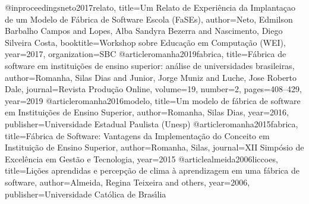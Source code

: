 @inproceedings{neto2017relato,
  title={Um Relato de Experi{\^e}ncia da Implanta{\c{c}}ao de um Modelo de F{\'a}brica de Software Escola (FaSEs)},
  author={Neto, Edmilson Barbalho Campos and Lopes, Alba Sandyra Bezerra and Nascimento, Diego Silveira Costa},
  booktitle={Workshop sobre Educa{\c{c}}{\~a}o em Computa{\c{c}}{\~a}o (WEI)},
  year={2017},
  organization={SBC}
}
@article{romanha2019fabrica,
  title={F{\'a}brica de software em institui{\c{c}}{\~o}es de ensino superior: an{\'a}lise de universidades brasileiras},
  author={Romanha, Silas Dias and Junior, Jorge Muniz and Luche, Jose Roberto Dale},
  journal={Revista Produ{\c{c}}{\~a}o Online},
  volume={19},
  number={2},
  pages={408--429},
  year={2019}
}
@article{romanha2016modelo,
  title={Um modelo de f{\'a}brica de software em Institui{\c{c}}{\~o}es de Ensino Superior},
  author={Romanha, Silas Dias},
  year={2016},
  publisher={Universidade Estadual Paulista (Unesp)}
}
@article{romanha2015fabrica,
  title={F{\'a}brica de Software: Vantagens da Implementa{\c{c}}{\~a}o do Conceito em Institui{\c{c}}{\~a}o de Ensino Superior},
  author={Romanha, Silas},
  journal={XII Simp{\'o}sio de Excel{\^e}ncia em Gest{\~a}o e Tecnologia},
  year={2015}
}
@article{almeida2006liccoes,
  title={Li{\c{c}}{\~o}es aprendidas e percep{\c{c}}{\~a}o de clima {\`a} aprendizagem em uma f{\'a}brica de software},
  author={Almeida, Regina Teixeira and others},
  year={2006},
  publisher={Universidade Cat{\'o}lica de Bras{\'\i}lia}
}

